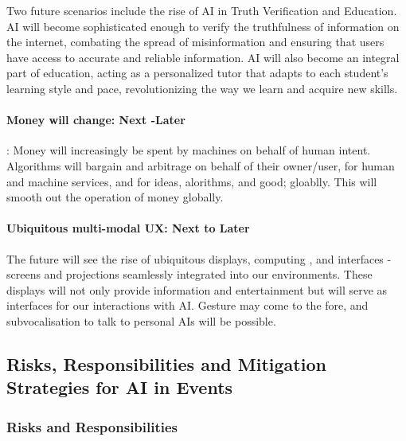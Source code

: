 Two future scenarios include the rise of AI in Truth Verification and Education. AI will become sophisticated enough to verify the truthfulness of information on the internet, combating the spread of misinformation and ensuring that users have access to accurate and reliable information. AI will also become an integral part of education, acting as a personalized tutor that adapts to each student's learning style and pace, revolutionizing the way we learn and acquire new skills.

\paragraph{Money will change: Next -Later}: Money will increasingly be spent by machines on behalf of human intent. Algorithms will bargain and arbitrage on behalf of their owner/user, for human and machine services, and for ideas, alorithms, and good; gloablly. This will smooth out the operation of money globally.

\paragraph{Ubiquitous multi-modal UX: Next to Later}
The future will see the rise of ubiquitous displays, computing \cite{lyytinen2002ubiquitous}, and interfaces - screens and projections seamlessly integrated into our environments. These displays will not only provide information and entertainment but will serve as interfaces for our interactions with AI. Gesture may come to the fore, and subvocalisation to talk to personal AIs will be possible.


\subsection{Risks, Responsibilities and Mitigation Strategies for AI in Events}

\subsubsection{Risks and Responsibilities}

